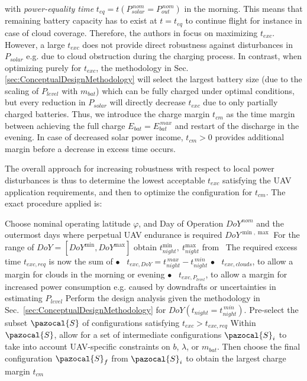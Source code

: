 with \textit{power-equality time} $t_{eq}=t(P_{solar}^{\,nom}=P_{out}^{\,nom})$ in the morning. This means that remaining battery capacity has to exist at $t=t_{eq}$ to continue flight for instance in case of cloud coverage. Therefore, the authors in \cite{Noth_PhD,Leutenegger_JIRS} focus on maximizing $t_{exc}$. However, a large $t_{exc}$ does not provide direct robustness against disturbances in $P_{solar}$ e.g. due to cloud obstruction during the charging process. In contrast, when optimizing purely for $t_{exc}$, the methodology in Sec. \ref{sec:ConceptualDesignMethodology} will select the largest battery size (due to the scaling of $P_{level}$ with $m_{bat}$) which can be fully charged under optimal conditions, but every reduction in $P_{solar}$ will directly decrease $t_{exc}$ due to only partially charged batteries. Thus, we introduce the charge margin $t_{cm}$ as the time margin between achieving the full charge $E_{bat}=E_{bat}^{\,max}$ and restart of the discharge in the evening. In case of decreased solar power income, $t_{cm}>0$ provides additional margin before a decrease in excess time occurs.

The overall approach for increasing robustness with respect to local power disturbances is thus to determine the lowest acceptable $t_{exc}$ satisfying the UAV application requirements, and then to optimize the configuration for $t_{cm}$. The exact procedure applied is:
\vspace{-3ex}
\begin{algorithm}[htp]
  \SetAlgoLined\DontPrintSemicolon
  \myproc{} %
  {
  \nl Choose nominal operating latitude $\varphi$, and Day of Operation $DoY^{nom}$ and the outermost days where perpetual UAV endurance is required $DoY^{\min,\max}$ \;
  \nl For the range of $DoY=[DoY^{\min},DoY^{\max}]$ obtain $t_{night}^{\min},~t_{night}^{\max}$ from~\cite{Duffie_SolarEngineering} \;
  \nl The required excess time $t_{exc,req}$ is now the sum of  \; 
  \pushline
  \nonl \scriptsize$\bullet$\normalsize~  $t_{exc,DoY} = t_{night}^{\,max}-t_{night}^{\,min}$ \;
  \nonl \scriptsize$\bullet$\normalsize~  $t_{exc,clouds}$, to allow a margin for clouds in the morning or evening \;
  \nonl \scriptsize$\bullet$\normalsize~  $t_{exc,P_{level}}$, to allow a margin for increased power consumption e.g. caused by downdrafts or uncertainties in estimating $P_{level}$ \;
  \popline \nl 
  \nl Perform the design analysis given the methodology in Sec.~\ref{sec:ConceptualDesignMethodology} for $DoY(t_{night}=t_{night}^{\,min})$. Pre-select the subset $\pazocal{S}$ of configurations satisfying $t_{exc}>t_{exc,req}$  \;
  \nl Within $\pazocal{S}$, allow for a set of intermediate configurations $\pazocal{S}_i$ to take into account UAV-specific constraints on $b$, $\lambda$, or $m_{bat}$. Then choose the final configuration $\pazocal{S}_f$  from $\pazocal{S}_i$ to obtain the largest charge margin $t_{cm}$ %

 }
\end{algorithm}

